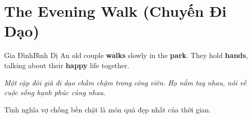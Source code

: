\section{The Evening Walk (Chuyến Đi Dạo)}
\begin{truyen}{Gia Đình}{Bình Dị}
An old couple \textbf{walks} slowly in the \textbf{park}. They hold \textbf{hands}, talking about their \textbf{happy} life together.

\textit{Một cặp đôi già đi dạo chầm chậm trong công viên. Họ nắm tay nhau, nói về cuộc sống hạnh phúc cùng nhau.}

\begin{baihoc}
Tình nghĩa vợ chồng bền chặt là món quà đẹp nhất của thời gian.
\end{baihoc}
\end{truyen}
